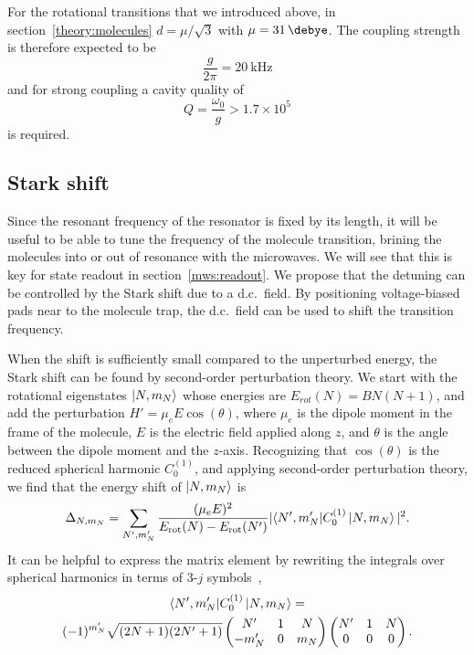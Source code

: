 For the rotational \CaF{} transitions that we introduced above, in
section~\ref{theory:molecules} $d = \mu/\sqrt{3}$ with $\mu =
\SI{31}{\debye}$.
%
The coupling strength is therefore expected to be
%
\begin{equation}
  \frac{g}{2\pi} = \SI{20}{\kilo\hertz}
\end{equation}
%
and for strong coupling a cavity quality of
%
\begin{equation}
  Q = \frac{\omega_0}{g} > 1.7 \times 10^5
\end{equation}
%
is required.

\subsection{Stark shift}

Since the resonant frequency of the resonator is fixed by its length, it will
be useful to be able to tune the frequency of the molecule transition, 
brining the molecules into or out of resonance with the microwaves. We will
see that this is key for state readout in section~\ref{mws:readout}. We propose
that the detuning can be controlled by the Stark shift due to a d.c.~field.  By
positioning voltage-biased pads near to the molecule trap, the d.c.~field can
be used to shift the transition frequency.

When the shift is sufficiently small compared to the unperturbed energy, the
Stark shift can be found by second-order perturbation theory.
%
We start with the rotational eigenstates $\ket{N,m_N}$ whose energies are
$E_{rot}(N)=B N(N+1)$, and add the perturbation $H'=\mu_e E \cos(\theta)$, where
$\mu_e$ is the dipole moment in the frame of the molecule, $E$ is the electric
field applied along $z$, and $\theta$ is the angle between the dipole moment
and the $z$-axis. Recognizing that $\cos(\theta)$ is the reduced spherical
harmonic $C^{(1)}_0$, and applying second-order perturbation theory, we find
that the energy shift of $\ket{N,m_N}$ is
%
\begin{equation}
  \Delta_{N, m_N} = \sum_{N', m_N'} \frac{(\mu_e E)^2}{E_\text{rot}(N) -
  E_\text{rot}(N')} |{\bra{N', m_N'}}C_0^{(1)} \ket{N, m_N}|^2.
\label{mws:eqn:Stark}
\end{equation}
%
It can be helpful to express the matrix element by rewriting the integrals over
spherical harmonics in terms of 3-$j$ symbols~\cite{edmonds1996},
%
\begin{multline} {\bra{N', m_N'}}C_0^{(1)} \ket{N, m_N} =
  \\ (-1)^{m_N'}\sqrt{(2N+1)(2N'+1)}
  \begin{pmatrix} N' & 1 & N \\ -m_N' & 0 & m_N \end{pmatrix} \begin{pmatrix}
N' & 1 & N \\ 0 & 0 & 0 \end{pmatrix}.
\end{multline}

